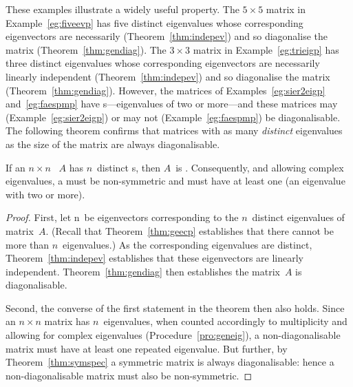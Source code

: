 These examples illustrate a widely useful property.
The \(5\times 5\) matrix in Example~\ref{eg:fiveevp} has five distinct eigenvalues whose corresponding eigenvectors are necessarily  (Theorem~\ref{thm:indepev}) and so diagonalise the matrix (Theorem~\ref{thm:gendiag}).
The \(3\times 3\) matrix in Example~\ref{eg:trieigp} has three distinct eigenvalues whose corresponding eigenvectors are necessarily linearly independent (Theorem~\ref{thm:indepev}) and so diagonalise the matrix (Theorem~\ref{thm:gendiag}).
However, the matrices of Examples~\ref{eg:sier2eigp} and~\ref{eg:faespmp} have s---eigenvalues of  two or more---and these matrices may (Example~\ref{eg:sier2eigp}) or may not (Example~\ref{eg:faespmp}) be diagonalisable.
The following theorem confirms that matrices with as many \emph{distinct} eigenvalues as the size of the matrix are always diagonalisable.






\begin{theorem} \label{thm:dlamd} 
If an \(n\times n\) ~\(A\) has \(n\)~distinct s, then \(A\)~is .
Consequently, and allowing complex eigenvalues, a  must be non-symmetric and must have at least one  (an eigenvalue with  two or more).
\end{theorem}
\begin{proof}  
First, let \hlist\vv n\ be eigenvectors corresponding to the \(n\)~distinct eigenvalues of matrix~\(A\).
(Recall that Theorem~\ref{thm:geecp} establishes that there cannot be more than \(n\)~eigenvalues.)
As the corresponding eigenvalues are distinct, Theorem~\ref{thm:indepev} establishes that these eigenvectors are linearly independent.
Theorem~\ref{thm:gendiag} then establishes the matrix~\(A\) is diagonalisable.

Second, the converse of the first statement in the theorem then also holds.
Since an \(n\times n\) matrix has \(n\)~eigenvalues, when counted accordingly to multiplicity and allowing for complex eigenvalues (Procedure~\ref{pro:geneig}), a non-diagonalisable matrix must have at least one repeated eigenvalue.  
But further, by Theorem~\ref{thm:symspec} a symmetric matrix is always diagonalisable: hence a non-diagonalisable matrix must also be non-symmetric.
\end{proof}


